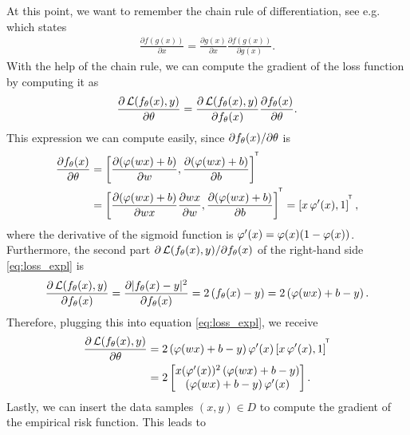\begin{example}
\begin{enumerate}
At this point, we want to remember the chain rule of differentiation, see e.g. \cite[Chapter~19.6]{simmons1995calculus} which states
\begin{align}\label{eq:chain_rule}
\frac{\partial f(g(x))}{\partial x} = \frac{\partial g(x)}{\partial x} \frac{\partial f(g(x))}{\partial g(x)}.
\end{align}
With the help of the chain rule, we can compute the gradient of the loss function by computing it as
\begin{align}\label{eq:loss_expl}
\frac{\partial \operatorname{\mathcal{L}}(f_\theta(x), y)}{\partial \theta} = \frac{\partial \operatorname{\mathcal{L}}(f_\theta(x), y)}{\partial f_\theta(x)}\frac{\partial f_\theta(x)}{\partial \theta}.
\end{align}
This expression we can compute easily, since $\partial f_\theta(x)/\partial \theta$ is
\begin{align*}
\frac{\partial f_\theta(x)}{\partial \theta}
&= \left[\frac{\partial (\operatorname{\varphi}(wx) + b)}{\partial w}, \frac{\partial (\operatorname{\varphi}(wx) + b)}{\partial b} \right]^{^{\mkern-1.5mu\mathsf{T}}}\\
&= \left[\frac{\partial (\operatorname{\varphi}(wx) + b)}{\partial wx} \frac{\partial wx}{\partial w}, \frac{\partial (\operatorname{\varphi}(wx) + b)}{\partial b} \right]^{^{\mkern-1.5mu\mathsf{T}}} = \left[x\operatorname{\varphi}^{\prime}(x), 1 \right]^{^{\mkern-1.5mu\mathsf{T}}},
\end{align*}
where the derivative of the sigmoid function is $\operatorname{\varphi}^{\prime}(x) = \operatorname{\varphi}(x)(1 - \operatorname{\varphi}(x))$.\\
Furthermore, the second part $\partial \operatorname{\mathcal{L}}(f_{\theta}(x), y)/\partial f_{\theta}(x)$ of the right-hand side \eqref{eq:loss_expl} is
\begin{align*}
\frac{\partial \operatorname{\mathcal{L}}(f_\theta(x), y)}{\partial f_\theta(x)} = \frac{\partial |f_\theta(x) - y|^2}{\partial f_\theta(x)} = 2 \left(f_\theta(x) - y \right) = 2 \left(\operatorname{\varphi}(wx) + b - y \right).
\end{align*}
Therefore, plugging this into equation \eqref{eq:loss_expl}, we receive
\begin{align*}
\frac{\partial \operatorname{\mathcal{L}}(f_\theta(x), y)}{\partial \theta} &= 2 \left(\operatorname{\varphi}(wx) + b - y \right) \operatorname{\varphi}^{\prime}(x) \left[x\operatorname{\varphi}^{\prime}(x), 1 \right]^{^{\mkern-1.5mu\mathsf{T}}}\\
&= 2 \left[ \begin{matrix}
x(\operatorname{\varphi}^{\prime}(x))^2\left(\operatorname{\varphi}(wx) + b - y \right)\\
\left(\operatorname{\varphi}(wx) + b - y \right) \operatorname{\varphi}^{\prime}(x)
\end{matrix}
\right].
\end{align*}
Lastly, we can insert the data samples $(x, y)\in D$ to compute the gradient of the empirical risk function. This leads to
\begin{align*}

\end{align*}
\end{enumerate}
\end{example}
